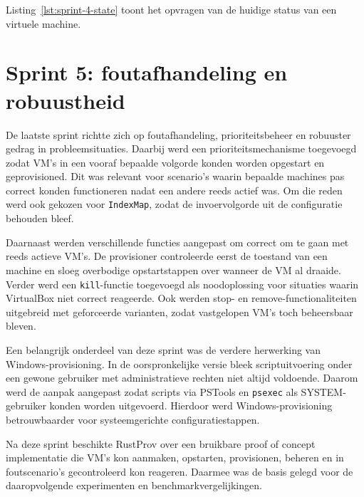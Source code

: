 Listing~\ref{lst:sprint-4-state} toont het opvragen van de huidige status van
een virtuele machine.

\section{Sprint 5: foutafhandeling en robuustheid}

De laatste sprint richtte zich op foutafhandeling, prioriteitsbeheer en robuuster gedrag in probleemsituaties. Daarbij werd een prioriteitsmechanisme toegevoegd zodat VM's in een vooraf bepaalde volgorde konden worden opgestart en geprovisioned. Dit was relevant voor scenario's waarin bepaalde machines pas correct konden functioneren nadat een andere reeds actief was. Om die reden werd ook gekozen voor \texttt{IndexMap}, zodat de invoervolgorde uit de configuratie behouden bleef.

Daarnaast werden verschillende functies aangepast om correct om te gaan met reeds actieve VM's. De provisioner controleerde eerst de toestand van een machine en sloeg overbodige opstartstappen over wanneer de VM al draaide. Verder werd een \texttt{kill}-functie toegevoegd als noodoplossing voor situaties waarin VirtualBox niet correct reageerde. Ook werden stop- en remove-functionaliteiten uitgebreid met geforceerde varianten, zodat vastgelopen VM's toch beheersbaar bleven.

Een belangrijk onderdeel van deze sprint was de verdere herwerking van Windows-provisioning. In de oorspronkelijke versie bleek scriptuitvoering onder een gewone gebruiker met administratieve rechten niet altijd voldoende. Daarom werd de aanpak aangepast zodat scripts via PSTools en \texttt{psexec} als SYSTEM-gebruiker konden worden uitgevoerd. Hierdoor werd Windows-provisioning betrouwbaarder voor systeemgerichte configuratiestappen.

Na deze sprint beschikte RustProv over een bruikbare proof of concept implementatie die VM's kon aanmaken, opstarten, provisionen, beheren en in foutscenario's gecontroleerd kon reageren. Daarmee was de basis gelegd voor de daaropvolgende experimenten en benchmarkvergelijkingen. 

